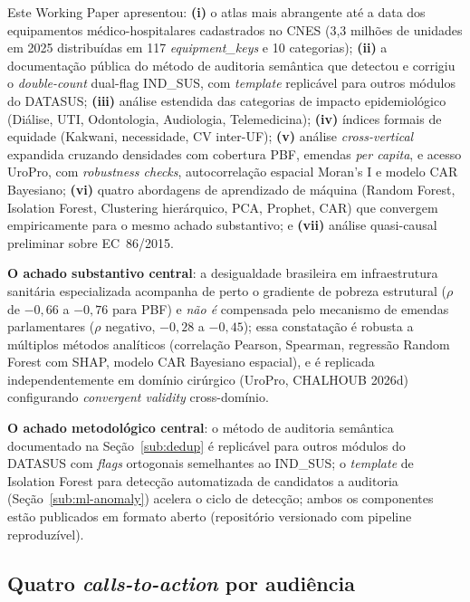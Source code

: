 \documentclass[12pt,a4paper,oneside]{article}
\begin{document}
Este Working Paper apresentou: \textbf{(i)} o atlas mais
abrangente até a data dos equipamentos médico-hospitalares
cadastrados no CNES (3,3 milhões de unidades em 2025
distribuídas em 117 \textit{equipment\_keys} e 10 categorias);
\textbf{(ii)} a documentação pública do método de auditoria
semântica que detectou e corrigiu o \textit{double-count}
dual-flag IND\_SUS, com \textit{template} replicável para outros
módulos do DATASUS; \textbf{(iii)} análise estendida das
categorias de impacto epidemiológico (Diálise, UTI,
Odontologia, Audiologia, Telemedicina); \textbf{(iv)} índices
formais de equidade (Kakwani, necessidade, CV inter-UF);
\textbf{(v)} análise \textit{cross-vertical} expandida cruzando
densidades com cobertura PBF, emendas \textit{per capita}, e
acesso UroPro, com \textit{robustness checks}, autocorrelação
espacial Moran's I e modelo CAR Bayesiano; \textbf{(vi)} quatro
abordagens de aprendizado de máquina (Random Forest, Isolation
Forest, Clustering hierárquico, PCA, Prophet, CAR) que convergem
empiricamente para o mesmo achado substantivo; e \textbf{(vii)}
análise quasi-causal preliminar sobre EC~86/2015.

\textbf{O achado substantivo central}: a desigualdade brasileira
em infraestrutura sanitária especializada acompanha de perto o
gradiente de pobreza estrutural ($\rho$ de $-0{,}66$ a $-0{,}76$
para PBF) e \textit{não é} compensada pelo mecanismo de emendas
parlamentares ($\rho$ negativo, $-0{,}28$ a $-0{,}45$); essa
constatação é robusta a múltiplos métodos analíticos
(correlação Pearson, Spearman, regressão Random Forest com
SHAP, modelo CAR Bayesiano espacial), e é replicada
independentemente em domínio cirúrgico (UroPro, CHALHOUB 2026d)
\textemdash{} configurando \textit{convergent validity}
cross-domínio.

\textbf{O achado metodológico central}: o método de auditoria
semântica documentado na Seção~\ref{sub:dedup} é replicável
para outros módulos do DATASUS com \textit{flags} ortogonais
semelhantes ao IND\_SUS; o \textit{template} de Isolation Forest
para detecção automatizada de candidatos a auditoria
(Seção~\ref{sub:ml-anomaly}) acelera o ciclo de detecção;
ambos os componentes estão publicados em formato aberto
(repositório versionado com pipeline reproduzível).

\subsection{Quatro \textit{calls-to-action} por
audiência}\label{sub:cta-audiencias}
\end{document}
